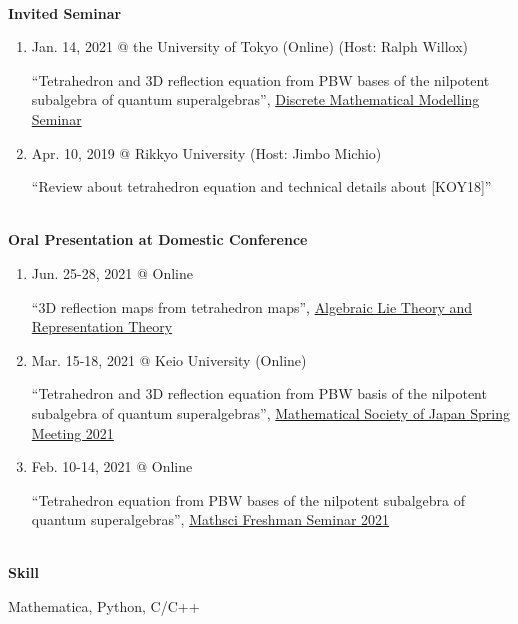 \documentclass[dvipdfmx]{jsarticle}
\begin{document}
%
%
%
%
{\ }\\
\vspace{3mm}
{\bf\large Invited Seminar}
\vspace{-6mm}
\\\hrulefill
\begin{enumerate}
\renewcommand*\theenumi{\the\numexpr\value{paperCounter3}-\value{enumi}}
\setcounter{paperCounter3}{3}
\item
Jan. 14, 2021 @ the University of Tokyo (Online) (Host: Ralph Willox)
\par
``Tetrahedron and 3D reflection equation from PBW bases of the nilpotent subalgebra of quantum superalgebras'', \href{https://www.ms.u-tokyo.ac.jp/seminar/discrete_e/past_e.html}{Discrete Mathematical Modelling Seminar}
%
%
\item
Apr. 10, 2019 @ Rikkyo University (Host: Jimbo Michio)
\par
``Review about tetrahedron equation and technical details about [KOY18]''
\end{enumerate}
%
%
%
%
{\ }\\
\vspace{3mm}
{\bf\large Oral Presentation at Domestic Conference}
\vspace{-6mm}
\\\hrulefill
\begin{enumerate}
\renewcommand*\theenumi{\the\numexpr\value{paperCounter4}-\value{enumi}}
\setcounter{paperCounter4}{4}
\item
Jun. 25-28, 2021 @ Online
\par
``3D reflection maps from tetrahedron maps'', \href{https://sites.google.com/view/altret2021/\%E3\%83\%9B\%E3\%83\%BC\%E3\%83\%A0?authuser=0}{Algebraic Lie Theory and Representation Theory}
%
%
\item
Mar. 15-18, 2021 @ Keio University (Online)
\par
``Tetrahedron and 3D reflection equation from PBW basis of the nilpotent subalgebra of quantum superalgebras'', \href{https://old.mathsoc.jp/en/meeting/keio21mar/}{Mathematical Society of Japan Spring Meeting 2021}
%
%
\item
Feb. 10-14, 2021 @ Online
\par
``Tetrahedron equation from PBW bases of the nilpotent subalgebra of quantum superalgebras'', \href{https://sites.google.com/view/math-graduate/MATHSCI-FRESHMAN-SEMINAR/2021}{Mathsci Freshman Seminar 2021}
\end{enumerate}
%
%
%
%
{\ }\\
\vspace{3mm}
{\bf\large Skill}
\vspace{-6mm}
\\\hrulefill
\par
Mathematica, Python, C/C++
%
%
%
%
\end{document}
